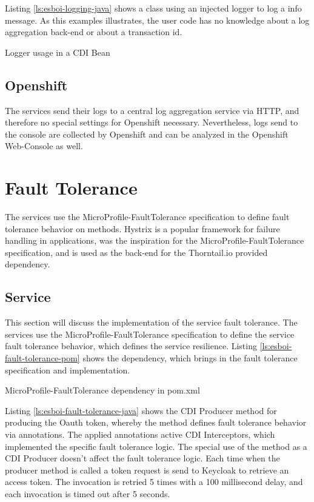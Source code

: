 Listing \vref{ls:esboi-logging-java} shows a class using an injected logger to log a info message. As this examples illustrates, the user code has no knowledge about a log aggregation back-end or about a transaction id.

\begin{listing}[h]
	\caption{Logger usage in a CDI Bean}
	\label{ls:esboi-logging-java}
\end{listing} 

\subsection{Openshift}
\label{sec:esbi-logging-openshift}
The services send their logs to a central log aggregation service via HTTP, and therefore no special settings for Openshift necessary. Nevertheless, logs send to the console are collected by Openshift and can be analyzed in the Openshift Web-Console as well.

\section{Fault Tolerance}
\label{sec:esbi-fault}
The services use the MicroProfile-FaultTolerance specification to define fault tolerance behavior on methods. Hystrix is a popular framework for failure handling in applications, was the inspiration for the MicroProfile-FaultTolerance specification, and is used as the back-end for the Thorntail.io provided dependency\cite{NetflixHystrix2018}.

\subsection{Service}
\label{sec:esbi-fault-service}
This section will discuss the implementation of the service fault tolerance. The services use the MicroProfile-FaultTolerance specification to define the service fault tolerance behavior, which defines the service resilience. Listing \vref{ls:esboi-fault-tolerance-pom} shows the dependency, which brings in the fault tolerance specification and implementation.

\begin{listing}[h]
	\caption{MicroProfile-FaultTolerance dependency in pom.xml}
	\label{ls:esboi-fault-tolerance-pom}
\end{listing}

Listing \vref{ls:esboi-fault-tolerance-java} shows the CDI Producer method for producing the Oauth token, whereby the method defines fault tolerance behavior via annotations. The applied annotations active CDI Interceptors, which implemented the specific fault tolerance logic. The special use of the method as a CDI Producer doesn't affect the fault tolerance logic. Each time when the producer method is called a token request is send to Keycloak to retrieve an access token. The invocation is retried 5 times with a 100 millisecond delay, and each invocation is timed out after 5 seconds.

